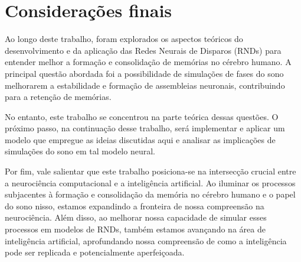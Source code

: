 \section{Considerações finais}

Ao longo deste trabalho, foram explorados os aspectos teóricos do desenvolvimento e da aplicação das Redes Neurais de Disparos
(RNDs) para entender melhor a formação e consolidação de memórias no cérebro humano. A principal questão abordada foi a
possibilidade de simulações de fases do sono melhorarem a estabilidade e formação de assembleias neuronais, contribuindo para a
retenção de memórias. 

No entanto, este trabalho se concentrou na parte teórica dessas questões. O próximo passo, na continuação desse trabalho, será
implementar e aplicar um modelo que empregue as ideias discutidas aqui e analisar as implicações de simulações do sono em tal
modelo neural.

Por fim, vale salientar que este trabalho posiciona-se na intersecção crucial entre a neurociência computacional e a inteligência
artificial. Ao iluminar os processos subjacentes à formação e consolidação da memória no cérebro humano e o papel do sono nisso,
estamos expandindo a fronteira de nossa compreensão na neurociência. Além disso, ao melhorar nossa capacidade de simular esses
processos em modelos de RNDs, também estamos avançando na área de inteligência artificial, aprofundando nossa compreensão de como
a inteligência pode ser replicada e potencialmente aperfeiçoada. 

